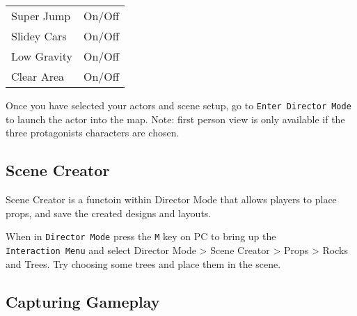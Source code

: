 \documentclass[
  openany]{book}
\begin{document}
\begin{longtable}[]{@{}ll@{}}
\begin{minipage}[t]{0.47\columnwidth}\raggedright
Super Jump\strut
\end{minipage} & \begin{minipage}[t]{0.47\columnwidth}\raggedright
On/Off\strut
\end{minipage}\tabularnewline
\begin{minipage}[t]{0.47\columnwidth}\raggedright
Slidey Cars\strut
\end{minipage} & \begin{minipage}[t]{0.47\columnwidth}\raggedright
On/Off\strut
\end{minipage}\tabularnewline
\begin{minipage}[t]{0.47\columnwidth}\raggedright
Low Gravity\strut
\end{minipage} & \begin{minipage}[t]{0.47\columnwidth}\raggedright
On/Off\strut
\end{minipage}\tabularnewline
\begin{minipage}[t]{0.47\columnwidth}\raggedright
Clear Area\strut
\end{minipage} & \begin{minipage}[t]{0.47\columnwidth}\raggedright
On/Off\strut
\end{minipage}\tabularnewline
\bottomrule
\end{longtable}

Once you have selected your actors and scene setup, go to \texttt{Enter\ Director\ Mode} to launch the actor into the map. Note: first person view is only available if the three protagonists characters are chosen.

\hypertarget{scene-creator}{%
\subsection*{Scene Creator}\label{scene-creator}}

Scene Creator is a functoin within Director Mode that allows players to place props, and save the created designs and layouts.

When in \texttt{Director\ Mode} press the \texttt{M} key on PC to bring up the \texttt{Interaction\ Menu} and select Director Mode \textgreater{} Scene Creator \textgreater{} Props \textgreater{} Rocks and Trees. Try choosing some trees and place them in the scene.

\hypertarget{capturing-gameplay}{%
\subsection*{Capturing Gameplay}\label{capturing-gameplay}}
\end{document}
